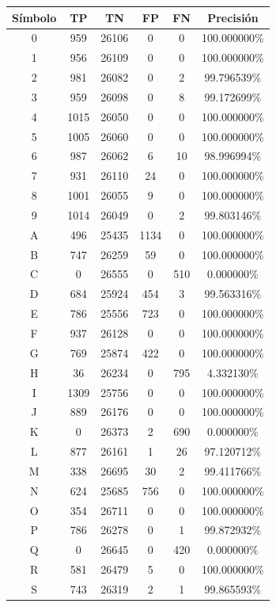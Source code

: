 \documentclass[a4paper, 11pt, oneside]{report}
\begin{document}
\begin{table}
\centering
\begin{tabular}{|c|c|c|c|c|c|}
	\hline
	Símbolo & TP & TN & FP & FN & Precisión \\ 
	\hline
	0 & 959 & 26106 & 0 & 0 & 100.000000\% \\ 
	1 & 956 & 26109 & 0 & 0 & 100.000000\% \\ 
	2 & 981 & 26082 & 0 & 2 & 99.796539\% \\ 
	3 & 959 & 26098 & 0 & 8 & 99.172699\% \\ 
	4 & 1015 & 26050 & 0 & 0 & 100.000000\% \\ 
	5 & 1005 & 26060 & 0 & 0 & 100.000000\% \\ 
	6 & 987 & 26062 & 6 & 10 & 98.996994\% \\ 
	7 & 931 & 26110 & 24 & 0 & 100.000000\% \\ 
	8 & 1001 & 26055 & 9 & 0 & 100.000000\% \\ 
	9 & 1014 & 26049 & 0 & 2 & 99.803146\% \\ 
	A & 496 & 25435 & 1134 & 0 & 100.000000\% \\ 
	B & 747 & 26259 & 59 & 0 & 100.000000\% \\ 
	C & 0 & 26555 & 0 & 510 & 0.000000\% \\ 
	D & 684 & 25924 & 454 & 3 & 99.563316\% \\ 
	E & 786 & 25556 & 723 & 0 & 100.000000\% \\ 
	F & 937 & 26128 & 0 & 0 & 100.000000\% \\ 
	G & 769 & 25874 & 422 & 0 & 100.000000\% \\ 
	H & 36 & 26234 & 0 & 795 & 4.332130\% \\ 
	I & 1309 & 25756 & 0 & 0 & 100.000000\% \\ 
	J & 889 & 26176 & 0 & 0 & 100.000000\% \\ 
	K & 0 & 26373 & 2 & 690 & 0.000000\% \\ 
	L & 877 & 26161 & 1 & 26 & 97.120712\% \\ 
	M & 338 & 26695 & 30 & 2 & 99.411766\% \\ 
	N & 624 & 25685 & 756 & 0 & 100.000000\% \\ 
	O & 354 & 26711 & 0 & 0 & 100.000000\% \\ 
	P & 786 & 26278 & 0 & 1 & 99.872932\% \\ 
	Q & 0 & 26645 & 0 & 420 & 0.000000\% \\ 
	R & 581 & 26479 & 5 & 0 & 100.000000\% \\ 
	S & 743 & 26319 & 2 & 1 & 99.865593\% \\ 

\end{tabular}
\end{table}
\end{document}
